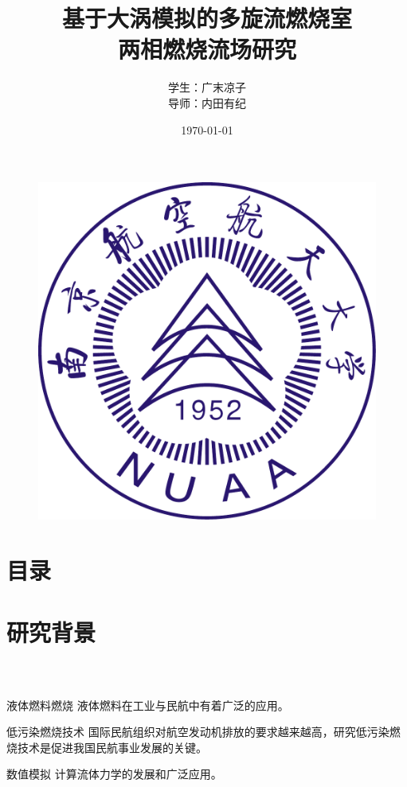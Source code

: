 \documentclass[nomath]{beamer}%
\begin{document}
\graphicspath{{figures/}} %
\captionsetup[figure]{font=footnotesize,labelfont=footnotesize}

\title{基于大涡模拟的多旋流燃烧室\\两相燃烧流场研究}
\author[广末凉子]{学生：广末凉子\\ \vskip 5pt 导师：内田有纪}
\date{\small \vskip -22pt \today}
\begin{frame}
	\vspace{-10mm}
		\maketitle
	\vspace{-44mm}
	\begin{figure}[htbp]
		\begin{center}
			\includegraphics[width=0.14\linewidth]{logo.pdf}
		\end{center}
	\end{figure}
\end{frame}
\section*{目录}
\begin{frame}
	\frametitle{\secname}
	\tableofcontents[sections={<1-5>}]
\end{frame}

\section{研究背景}
\begin{frame}
	\frametitle{\secname~ }
	\begin{block}{液体燃料燃烧}
		液体燃料在工业与民航中有着广泛的应用。
	\end{block}
	\begin{block}{低污染燃烧技术}
		国际民航组织对航空发动机排放的要求越来越高，研究低污染燃烧技术是促进我国民航事业发展的关键。
	\end{block}
	\begin{block}{数值模拟}
		计算流体力学的发展和广泛应用。
	\end{block}
\end{frame}
\end{document}
